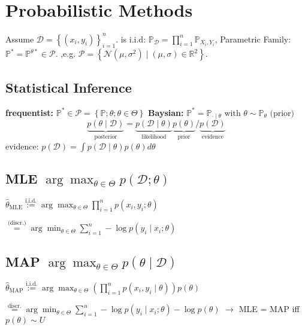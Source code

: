 \section*{Probabilistic Methods}

Assume $\mathcal{D} = \left\{ (x_i, y_i) \right\}_{i=1}^{n}.$ is i.i.d: $\mathbb{P}_{\mathcal{D}} = \prod_{i=1}^{n} \mathbb{P}_{X_i, Y_i}
$, 
Parametric Family: $\mathbb{P}^* = \mathbb{P}^{\theta*} \in \mathcal{P}.$  ,e.g. $\mathcal{P} = \left\{ \mathcal{N}(\mu, \sigma^2) \mid (\mu, \sigma) \in \mathbb{R}^2 \right\}.$

\subsection*{Statistical Inference}

\textbf{frequentist:} $\mathbb{P}^* \in \mathcal{P} = \left\{ \mathbb{P}; \theta; \theta \in \Theta \right\}$
\textbf{Baysian:} $\mathbb{P}^* = \mathbb{P}_{\cdot \mid \theta} \text{ with } \theta \sim \mathbb{P}_{\theta} \text{ (prior)}$ \\[-15pt]

\[
\underbrace{p( \theta \mid \mathcal{D})}_{\text{posterior}} = \underbrace{p(\mathcal{D} \mid \theta)}_{\text{likelihood}} \underbrace{p(\theta)}_{\text{prior}} / {\underbrace{p(\mathcal{D})}_{\text{evidence}}}
\] 
evidence: $p(\mathcal{D}) = \int p(\mathcal{D} \mid \theta) p(\theta) d\theta$

\subsection*{MLE \quad \color{black}$\arg \max_{\theta \in \Theta} p(\mathcal{D}; \theta)$} 
$\hat{\theta}_{\text{MLE}} \overset{\text{i.i.d.}}{:=} \arg \max_{\theta \in \Theta} \prod_{i=1}^{n} p(x_i, y_i; \theta)$

$\overset{\text{(discr.)}}{=} \arg \min_{\theta \in \Theta} \sum_{i=1}^{n} -\log p(y_i \mid x_i; \theta)$

\subsection*{MAP \quad \color{black}$\arg \max_{\theta \in \Theta} p(\theta \mid \mathcal{D})$}
$\hat{\theta}_{\text{MAP}} \overset{\text{i.i.d.}}{:=} \arg \max_{\theta \in \Theta} \left( \prod_{i=1}^{n} p(x_i, y_i \mid \theta) \right) p(\theta)$

$\overset{\text{discr.}}{=} \arg \min_{\theta \in \Theta} \sum_{i=1}^{n} -\log p(y_i \mid x_i; \theta) - \log p(\theta)$ $\rightarrow$ MLE = MAP iff $p(\theta) \sim U$



